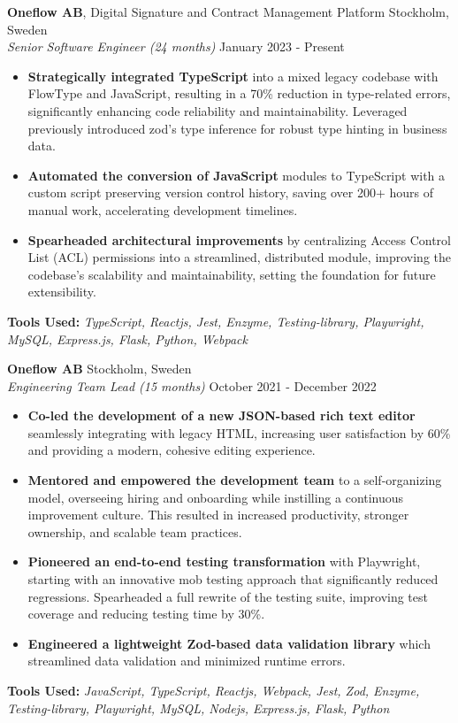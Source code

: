 \begin{minipage}[t]{0.61\textwidth}
\Large
\noindent
\textbf{\Large Oneflow AB}, Digital Signature and Contract Management Platform \hfill Stockholm, Sweden\\ %
\textit{Senior Software Engineer (24 months)} \hfill January 2023 - Present %
\begin{itemize}
\setlength{\itemsep}{0.5em}
    \item \textbf{Strategically integrated TypeScript} into a mixed legacy codebase with FlowType and JavaScript, resulting in a 70\% reduction in type-related errors, significantly enhancing code reliability and maintainability.
    Leveraged previously introduced zod's type inference for robust type hinting in business data.
    \item \textbf{Automated the conversion of JavaScript} modules to TypeScript with a custom script preserving version control history, saving over 200+ hours of manual work, accelerating development timelines.
    \item \textbf{Spearheaded architectural improvements} by centralizing Access Control List (ACL) permissions into a streamlined, distributed module, improving the codebase’s scalability and maintainability, setting the foundation for future extensibility.
\end{itemize}
\vspace{1em}
\textbf{Tools Used:} \textit{TypeScript, Reactjs, Jest, Enzyme, Testing-library, Playwright, MySQL, Express.js, Flask, Python, Webpack}

\vspace{1.5em}

\noindent
\textbf{Oneflow AB} \hfill Stockholm, Sweden\\
\textit{Engineering Team Lead (15 months)} \hfill October 2021 - December 2022 %
\begin{itemize}
\setlength{\itemsep}{0.5em}
    \item \textbf{Co-led the development of a new JSON-based rich text editor} seamlessly integrating with legacy HTML, increasing user satisfaction by 60\% and providing a modern, cohesive editing experience.
    \item \textbf{Mentored and empowered the development team} to a self-organizing model, overseeing hiring and onboarding while instilling a continuous improvement culture. This resulted in increased productivity, stronger ownership, and scalable team practices.
    \item \textbf{Pioneered an end-to-end testing transformation} with Playwright, starting with an innovative mob testing approach that significantly reduced regressions. Spearheaded a full rewrite of the testing suite, improving test coverage and reducing testing time by 30\%.
    \item \textbf{Engineered a lightweight Zod-based data validation library} which streamlined data validation and minimized runtime errors.
\end{itemize}

\vspace{1em}

\textbf{Tools Used:} \textit{JavaScript, TypeScript, Reactjs, Webpack, Jest, Zod, Enzyme, Testing-library, Playwright, MySQL, Nodejs, Express.js, Flask, Python}

\end{minipage}
